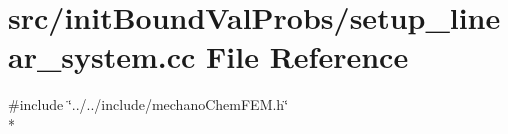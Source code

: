 \section{src/init\-Bound\-Val\-Probs/setup\-\_\-linear\-\_\-system.cc File Reference}
\label{setup__linear__system_8cc}
{\ttfamily \#include \char`\"{}../../include/mechano\-Chem\-F\-E\-M.\-h\char`\"{}}\\*
